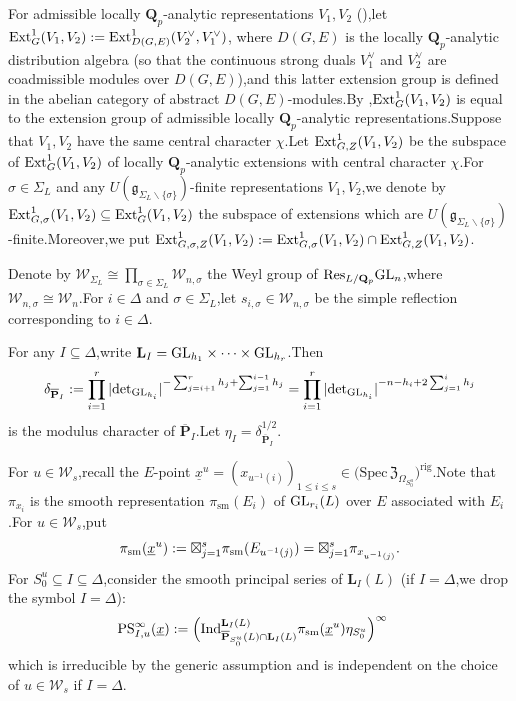 \documentclass[10pt]{article}
\newcommand{\ind}{{\rm Ind}}
\newcommand{\ext}{{\rm Ext}}
\newcommand{\GLN}{{\rm GL}}
\newcommand{\op}{{\overline{{\mathbf{P}}}}}
\newcommand{\sm}{{\rm sm}}
\newcommand{\res}{{\rm Res}}
\newcommand{\sbanpiku}{{\big(\mathrm{Spec}\hspace{2pt}\FZ_{\Omega_{S^u_0}}\big)^{\mathrm{rig}}}}
\newcommand{\bL}{{\mathbf{L}}}
\newcommand{\bQ}{{\mathbf{Q}}}
\newcommand{\FZ}{{\mathfrak{Z}}}
\newcommand{\fg}{{\mathfrak{g}}}
\newcommand{\sW}{\mathscr W}
\begin{document}
For admissible locally $\bQ_p$-analytic representations $V_1,V_2$ (\cite{Coadmissible}),\;let $\ext^1_{G}(V_1,V_2):=\ext^1_{D(G,E)}(V_2^{\vee},V_1^{\vee})$, where $D(G,E)$ is the locally $\bQ_p$-analytic distribution algebra (so that the continuous strong duals $V_1^{\vee}$ and $V_2^{\vee}$ are coadmissible modules over $D(G,E)$),\;and this latter extension group is defined in the abelian category of abstract $D(G,E)$-modules.\;By \cite[Lemma 2.1.1]{breuil2019ext1},\;$\ext^1_{G}(V_1,V_2)$ is equal to the extension group of admissible locally $\bQ_p$-analytic representations.\;Suppose that $V_1,V_2$ have the same central character $\chi$.\;Let $\ext^1_{G,Z}(V_1,V_2)$ be the subspace of $\ext^1_{G}(V_1,V_2)$ of locally $\bQ_p$-analytic extensions with central character $\chi$.\;For $\sigma\in \Sigma_L$ and any $U(\fg_{\Sigma_L\backslash\{\sigma\}})$-finite representations $V_1,V_2$,\;we denote by $\ext^1_{G,\sigma}(V_1,V_2)\subseteq \ext^1_{G}(V_1,V_2)$ the subspace of extensions which are 
$U(\fg_{\Sigma_L\backslash\{\sigma\}})$-finite.\;Moreover,\;we put $\ext^1_{G,\sigma,Z}(V_1,V_2):=\ext^1_{G,\sigma}(V_1,V_2)\cap \ext^1_{G,Z}(V_1,V_2)$.\;


Denote by $\sW_{\Sigma_L}\cong \prod_{\sigma\in \Sigma_L}\sW_{n,\sigma}$  the Weyl group of $\res_{L/\bQ_p}\GLN_n$,\;where $\sW_{n,\sigma}\cong \sW_n$.\;For $i\in \Delta$ and $\sigma\in \Sigma_L$,\;let $s_{i,\sigma}\in \sW_{n,\sigma}$ be the simple reflection corresponding to $i\in \Delta$.\;



For any $I\subseteq \Delta$,\;write $\bL_I=\GLN_{h_1}\times\cdots\times \GLN_{h_r}$.\;Then
\[\delta_{\op_I}:=\prod_{i=1}^r|\mathrm{det}_{\GLN_{h_i}}|^{-\sum_{j=i+1}^rh_j+\sum_{j=1}^{i-1}h_j}=\prod_{i=1}^r|\mathrm{det}_{\GLN_{h_i}}|^{-n-h_i+2\sum_{j=1}^{i}h_j}\]
is the  modulus character of $\op_I$.\;Let $\eta_I=\delta_{\op_I}^{1/2}$.\;


For $u\in \sW_s$,\;recall the $E$-point $\underline{x}^u=(x_{u^{-1}(i)})_{1\leq i\leq s}\in \sbanpiku$.\;Note that $\pi_{x_i}$ is the smooth representation $\pi_{\mathrm{sm}}(E_{i})$ of $\GLN_{r_i}(L)$ over $E$ associated with $E_{i}$.\;For $u\in \sW_{s}$,\;put 
\[\pi_{\sm}(\underline{x}^u):=\boxtimes_{j=1}^s\pi_{\mathrm{sm}}(E_{u^{-1}(j)})=\boxtimes_{j=1}^s\pi_{x_{u^{-1}(j)}}.\]
For $S_0^u\subseteq I\subseteq \Delta$,\;consider the smooth principal series of $\bL_{I}(L)$ (if $I=\Delta$,\;we drop the symbol $I=\Delta$):
\begin{equation}
	\begin{aligned}
		\mathrm{PS}^{\infty}_{I,u}(\underline{x})&:=\Big(\ind^{\bL_I(L)}_{\op_{S^u_0}(L)\cap \bL_I(L) }\pi_{\sm}(\underline{x}^u)\eta_{S^u_0}\Big)^{\infty}
	\end{aligned}
\end{equation}
which is irreducible by the generic assumption and is independent on the choice of $u\in \sW_s$ if $I=\Delta$.\;
\end{document}
